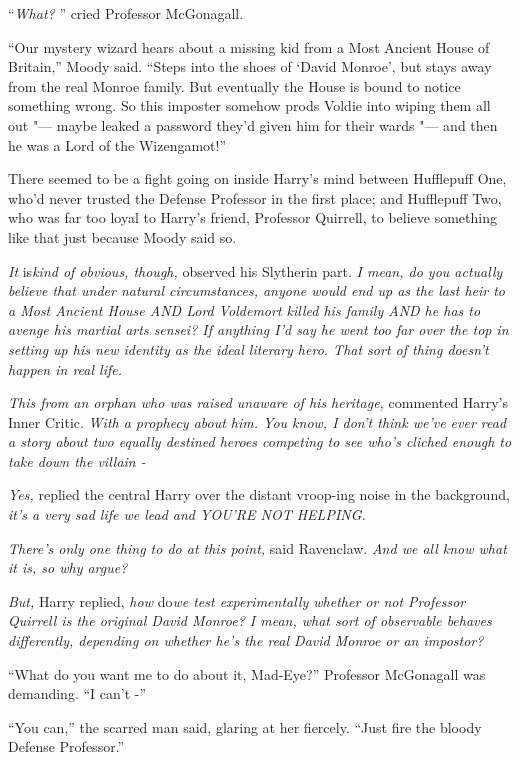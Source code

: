 ``\emph{What?} '' cried Professor McGonagall.

``Our mystery wizard hears about a missing kid from a Most Ancient House
of Britain,'' Moody said. ``Steps into the shoes of `David Monroe', but
stays away from the real Monroe family. But eventually the House is
bound to notice something wrong. So this imposter somehow prods Voldie
into wiping them all out "--- maybe leaked a password they'd given him for
their wards "--- and then he was a Lord of the Wizengamot!''

There seemed to be a fight going on inside Harry's mind between
Hufflepuff One, who'd never trusted the Defense Professor in the first
place; and Hufflepuff Two, who was far too loyal to Harry's friend,
Professor Quirrell, to believe something like that just because Moody
said so.

\emph{It} is\emph{kind of obvious, though,} observed his Slytherin part.
\emph{I mean, do you actually believe that under natural circumstances,
anyone would end up as the last heir to a Most Ancient House AND Lord
Voldemort killed his family AND he has to avenge his martial arts
sensei? If anything I'd say he went too far over the top in setting up
his new identity as the ideal literary hero. That sort of thing doesn't
happen in real life.}

\emph{This from an orphan who was raised unaware of his heritage,}
commented Harry's Inner Critic. \emph{With a prophecy about him. You
know, I don't think we've ever read a story about two equally destined
heroes competing to see who's cliched enough to take down the villain -}

\emph{Yes,} replied the central Harry over the distant vroop-ing noise
in the background, \emph{it's a very sad life we lead and YOU'RE NOT
HELPING.}

\emph{There's only one thing to do at this point,} said Ravenclaw.
\emph{And we all know what it is, so why argue?}

\emph{But,} Harry replied, \emph{how} do\emph{we test experimentally
whether or not Professor Quirrell is the original David Monroe? I mean,
what sort of observable behaves differently, depending on whether he's
the real David Monroe or an impostor?}

``What do you want me to do about it, Mad-Eye?'' Professor McGonagall
was demanding. ``I can't -''

``You can,'' the scarred man said, glaring at her fiercely. ``Just fire
the bloody Defense Professor.''

